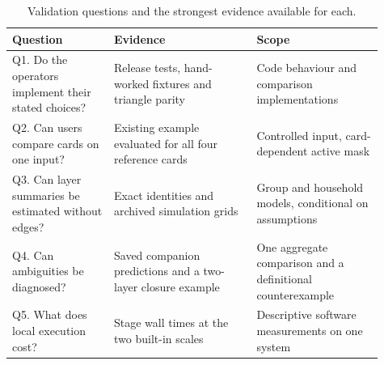 \begin{table}[!htbp]
\centering\small
\caption{Validation questions and the strongest evidence available for each.}
\label{tab:questions}
\begin{tabular}{@{} >{\raggedright\arraybackslash}p{0.25\linewidth} >{\raggedright\arraybackslash}p{0.35\linewidth} >{\raggedright\arraybackslash}p{0.31\linewidth} @{}}
\toprule
\rowcolor{tableblue} \textbf{Question} & \textbf{Evidence} & \textbf{Scope} \\
\midrule
Q1. Do the operators implement their stated choices? & Release tests, hand-worked fixtures and triangle parity & Code behaviour and comparison implementations \\
Q2. Can users compare cards on one input? & Existing example evaluated for all four reference cards & Controlled input, card-dependent active mask \\
Q3. Can layer summaries be estimated without edges? & Exact identities and archived simulation grids & Group and household models, conditional on assumptions \\
Q4. Can ambiguities be diagnosed? & Saved companion predictions and a two-layer closure example & One aggregate comparison and a definitional counterexample \\
Q5. What does local execution cost? & Stage wall times at the two built-in scales & Descriptive software measurements on one system \\
\bottomrule
\end{tabular}
\end{table}
